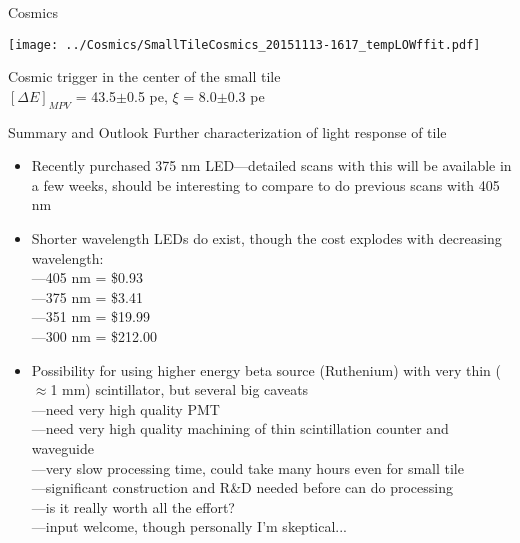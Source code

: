 \documentclass[compress,8pt]{beamer} %
\begin{document}
\begin{frame}{Cosmics}
\begin{adjustwidth}{-3em}{-3em}
\begin{center}
\texttt{[image: ../Cosmics/SmallTileCosmics\_20151113-1617\_tempLOWffit.pdf]}
\end{center}
\end{adjustwidth}
\vspace{-10pt}
Cosmic trigger in the center of the small tile \\
$[\Delta E]_{MPV}$ = 43.5$\pm$0.5 pe, $\xi$ = 8.0$\pm$0.3 pe \\%
\end{frame}








\begin{frame}{Summary and Outlook}
Further characterization of light response of tile
\begin{itemize}
\item Recently purchased 375 nm LED---detailed scans with this will be available in a few weeks,
should be interesting to compare to do previous scans with 405 nm
\item Shorter wavelength LEDs do exist, though the cost explodes with decreasing wavelength: \\
---405 nm = \$0.93 \\
---375 nm = \$3.41 \\
---351 nm = \$19.99 \\
---300 nm = \$212.00 \\
\item Possibility for using higher energy beta source (Ruthenium) with very thin ($\approx$1 mm) scintillator,
but several big caveats \\
---need very high quality PMT \\
---need very high quality machining of thin scintillation counter and waveguide \\
---very slow processing time, could take many hours even for small tile \\
---significant construction and R\&D needed before can do processing \\
---is it really worth all the effort? \\
---input welcome, though personally I'm skeptical...
\end{itemize}
\end{frame}
\end{document}
